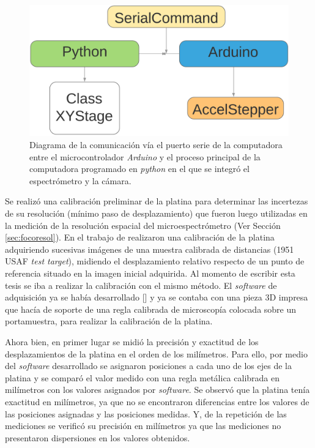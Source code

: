\begin{figure}[H]
	\centering
	\includegraphics[scale=0.5]{Figs/microespectrometro/diagflujoplatina.png}
	\caption{Diagrama de la comunicación vía el puerto serie de la computadora entre el microcontrolador \textit{Arduino} y el proceso principal de la computadora programado en \textit{python} en el que se integró el espectrómetro y la cámara.}
	\label{fig:cnpl}
\end{figure}

Se realizó una calibración preliminar de la platina para determinar las incertezas de su resolución (mínimo paso de desplazamiento) que fueron luego utilizadas en la medición de la resolución espacial del microespectrómetro (Ver Sección \ref{sec:focoresol}). En el trabajo de \cite{schaa} realizaron una calibración de la platina adquiriendo sucesivas imágenes de una muestra calibrada de distancias (1951 USAF \textit{test target}), midiendo el desplazamiento relativo respecto de un punto de referencia situado en la imagen inicial adquirida. Al momento de escribir esta tesis se iba a realizar la calibración con el mismo método. El \textit{software} de adquisición ya se había desarrollado [\href{https://github.com/jrr1984/defectsGUI/blob/master/views.py}{\faGithub}] y ya se contaba con una pieza 3D impresa que hacía de soporte de una regla calibrada de microscopía colocada sobre un portamuestra, para realizar la calibración de la platina.

Ahora bien, en primer lugar se midió la precisión y exactitud de los desplazamientos de la platina en el orden de los milímetros. Para ello, por medio del \textit{software} desarrollado se asignaron posiciones a cada uno de los ejes de la platina y se comparó el valor medido con una regla metálica calibrada en milímetros con los valores asignados por \textit{software}. Se observó que la platina tenía exactitud en milímetros, ya que no se encontraron diferencias entre los valores de las posiciones asignadas y las posiciones medidas. Y, de la repetición de las mediciones se verificó su precisión en milímetros ya que las mediciones no presentaron dispersiones en los valores obtenidos.

